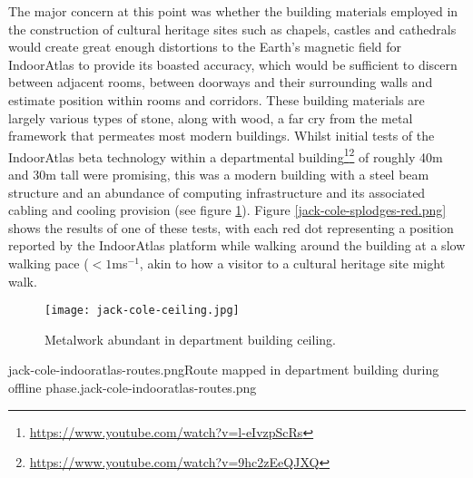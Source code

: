 The major concern at this point was whether the building materials employed in the construction of cultural heritage sites such as chapels, castles and cathedrals would create great enough distortions to the Earth's magnetic field for IndoorAtlas to provide its boasted accuracy, which would be sufficient to discern between adjacent rooms, between doorways and their surrounding walls and estimate position within rooms and corridors. These building materials are largely various types of stone, along with wood, a far cry from the metal framework that permeates most modern buildings. Whilst initial tests of the IndoorAtlas beta technology within a departmental building\footnote{\url{https://www.youtube.com/watch?v=l-eIvzpScRs}}\footnote{\url{https://www.youtube.com/watch?v=9hc2zEeQJXQ}} of roughly 40m and 30m tall were promising, this was a modern building with a steel beam structure and an abundance of computing infrastructure and its associated cabling and cooling provision (see figure \ref{jack-cole-ceiling.jpg}). Figure \ref{jack-cole-splodges-red.png} shows the results of one of these tests, with each red dot representing a position reported by the IndoorAtlas platform while walking around the building at a slow walking pace ($<1$ms$^{-1}$, akin to how a visitor to a cultural heritage site might walk.

\begin{figure}[h]
	\begin{center}
		\texttt{[image: jack-cole-ceiling.jpg]}
		\caption{Metalwork abundant in department building ceiling.}
		\label{jack-cole-ceiling.jpg}
	\end{center}
\end{figure}

       {jack-cole-indooratlas-routes.png}{Route mapped in department building during offline phase.}{jack-cole-indooratlas-routes.png}

